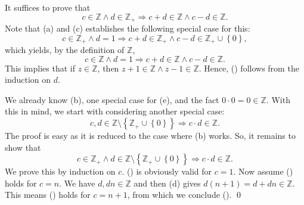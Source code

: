 \documentclass[a4paper,12pt]{article}
\begin{document}
\begin{sol}
	It suffices to prove that
	\begin{equation}
		c\in \mathbb{Z} \wedge d \in \mathbb{Z}_{+}
		\Rightarrow
		c+d \in \mathbb{Z} \wedge c-d \in \mathbb{Z}.
		\label{eq:sec4E5d}
	\end{equation}
	Note that (a) and (c) establishes the following special case for this:
	\begin{equation*}
		c\in \mathbb{Z}_{+} \wedge d=1
		\Rightarrow
		c+d \in \mathbb{Z}_{+} \wedge c-d \in \mathbb{Z}_{+}\cup \left\{ 0 \right\},
	\end{equation*}
	which yields, by the definition of \( \mathbb{Z} \),
	\begin{equation*}
		c\in \mathbb{Z} \wedge d=1
		\Rightarrow
		c+d \in \mathbb{Z} \wedge c-d \in \mathbb{Z}.
	\end{equation*}
	This implies that if
	\( z\in \mathbb{Z} \),
	then
	\( z+1\in \mathbb{Z} \wedge z-1\in \mathbb{Z} \).
	Hence,
	()
	follows from the induction on
	\( d\).
	
	We already know (b), one special case for (e), and the fact
	\( 0\cdot 0 =0 \in \mathbb{Z} \).
	With this in mind, we start with considering another special case:
	\begin{equation*}
		c,d \in \mathbb{Z} \setminus
		\left\{ \mathbb{Z}_{+}\cup \left\{ 0 \right\} \right\}
		\Rightarrow
		c \cdot d \in \mathbb{Z}.
	\end{equation*}
	The proof is easy as it is reduced to the case where (b) works.
	So, it remains to show that
	\begin{equation}
		c \in \mathbb{Z}_{+}
		\wedge
		d\in \mathbb{Z} \setminus
		\left\{ \mathbb{Z}_{+}\cup \left\{ 0 \right\} \right\}
		\Rightarrow
		c \cdot d \in \mathbb{Z}.
		\label{eq:Sec4E5e}
	\end{equation}
	We prove this by induction on \( c \).
	() is obviously valid for
	\( c = 1\).
	Now assume () holds for \( c = n\).
	We have
	\( d, dn \in \mathbb{Z} \)
	and then (d) gives
	\( d(n+1) = d+dn \in \mathbb{Z} \).
	This means () holds for \( c=n+1 \),
	from which we conclude ().
	\qed\end{sol}
\end{document}

